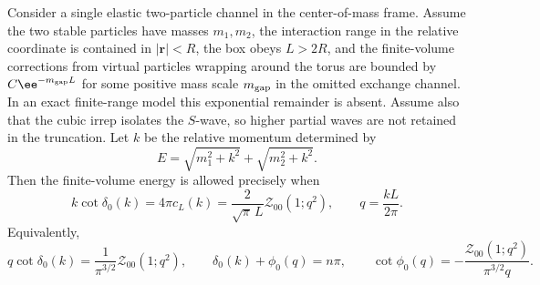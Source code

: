 \begin{proposition}
\label{prop:qcd-swave-luscher-wave-matching}
Consider a single elastic two-particle channel in the center-of-mass frame.
Assume the two stable particles have masses \(m_1,m_2\), the interaction range
in the relative coordinate is contained in \(|\mathbf r|<R\), the box obeys
\(L>2R\), and the finite-volume corrections from virtual particles wrapping
around the torus are bounded by \(C\ee^{-m_{\rm gap}L}\) for some positive
mass scale \(m_{\rm gap}\) in the omitted exchange channel.  In an exact
finite-range model this exponential remainder is absent.  Assume also that
the cubic irrep isolates the \(S\)-wave, so higher partial waves are not
retained in the truncation.  Let \(k\) be the relative momentum determined by
\[
  E=\sqrt{m_1^2+k^2}+\sqrt{m_2^2+k^2}.
\]
Then the finite-volume energy is allowed precisely when
\begin{equation}
  k\cot\delta_0(k)=4\pi c_L(k)
  =
  \frac{2}{\sqrt\pi\,L}\mathcal Z_{00}(1;q^2),
  \qquad q=\frac{kL}{2\pi}.
  \label{eq:qcd-swave-luscher-kcot-form}
\end{equation}
Equivalently,
\begin{equation}
  q\cot\delta_0(k)=\frac1{\pi^{3/2}}\mathcal Z_{00}(1;q^2),
  \qquad
  \delta_0(k)+\phi_0(q)=n\pi,
  \qquad
  \cot\phi_0(q)=
  -\frac{\mathcal Z_{00}(1;q^2)}{\pi^{3/2}q}.
  \label{eq:qcd-swave-luscher-phase-form}
\end{equation}
\end{proposition}

